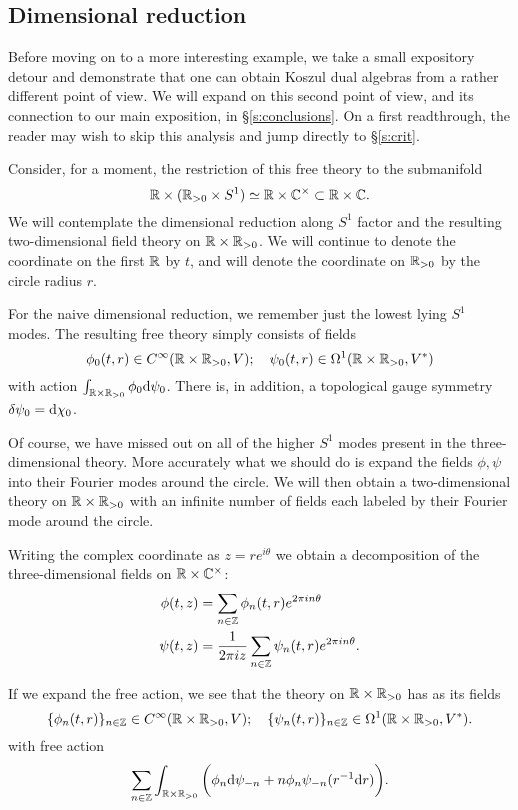 \documentclass[11pt]{amsart}
\begin{document}
\subsection{Dimensional reduction}

Before moving on to a more interesting example, we take a small expository detour and demonstrate that one can obtain Koszul dual algebras from a rather different point of view. We will expand on this second point of view, and its connection to our main exposition, in \S \ref{s:conclusions}. On a first readthrough, the reader may wish to skip this analysis and jump directly to \S \ref{s:crit}. 

Consider, for a moment, the restriction of this free theory to the submanifold 
\[
\mathbb R \times (\mathbb R_{>0} \times S^1) \simeq \mathbb R \times \mathbb C^\times \subset \mathbb R \times \mathbb C .
\]
We will contemplate the dimensional reduction along $S^1$ factor and the resulting two-dimensional field theory on $\mathbb R \times \mathbb R_{>0}$. 
We will continue to denote the coordinate on the first $\mathbb R$ by $t$, and will denote the coordinate on $\mathbb R_{>0}$ by the circle radius $r$.  

For the naive dimensional reduction, we remember just the lowest lying $S^1$ modes. 
The resulting free theory simply consists of fields
\[
\phi_0(t,r) \in C^\infty(\mathbb R \times \mathbb R_{>0} , V) ; \quad \psi_0 (t,r) \in \Omega^1 (\mathbb R \times \mathbb R_{>0}, V^*) 
\] 
with action $\int_{\mathbb R\times \mathbb R_{>0}} \phi_0 {\rm d} \psi_0$.
There is, in addition, a topological gauge symmetry $\delta \psi_0 = {\rm d} \chi_0$. 

Of course, we have missed out on all of the higher $S^1$ modes present in the three-dimensional theory. 
More accurately what we should do is expand the fields $\phi, \psi$ into their Fourier modes around the circle.
We will then obtain a two-dimensional theory on $\mathbb R \times \mathbb R_{>0}$ with an infinite number of fields each labeled by their Fourier mode around the circle. 

Writing the complex coordinate as $z = r e^{i \theta}$ we obtain a decomposition of the three-dimensional fields on $\mathbb R \times \mathbb C^\times$:
\begin{align*}
\phi(t,z) & = \sum_{n \in \mathbb Z} \phi_n (t,r) e^{2 \pi i n \theta} \\
\psi(t,z) & = \frac{1}{2 \pi i z} \sum_{n \in \mathbb Z} \psi_n(t, r) e^{2 \pi i n \theta} .
\end{align*}

If we expand the free action, we see that the theory on $\mathbb R \times \mathbb R_{>0}$ has as its fields 
\[
\{\phi_n(t,r)\}_{n \in \mathbb Z} \in C^\infty(\mathbb R \times \mathbb R_{>0} , V) ; \quad \{\psi_n (t,r)\}_{n \in \mathbb Z} \in \Omega^1 (\mathbb R \times \mathbb R_{>0}, V^*) .
\] 
with free action
\[
\sum_{n \in \mathbb Z} \int_{\mathbb R \times \mathbb R_{>0}} \bigg(\phi_n {\rm d} \psi_{-n} + n \phi_n \psi_{-n} (r^{-1} {\rm d} r)  \bigg).
\]
\end{document}
